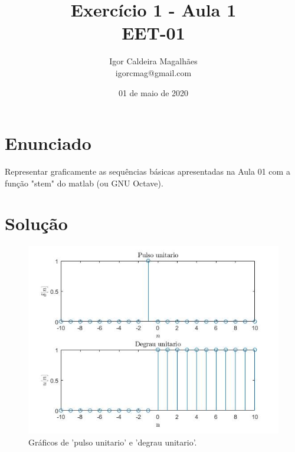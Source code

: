 \documentclass[a4paper, 12pt]{article}
\title{Exercício 1 - Aula 1 \\ EET-01}
\author{
  Igor Caldeira Magalhães\\igorcmag@gmail.com
}
\date{01 de maio de 2020}
\begin{document}
\maketitle
\section{Enunciado}

Representar graficamente as sequências básicas apresentadas na Aula 01 com a função "stem" do matlab (ou GNU Octave).


\section{Solução}



\begin{figure}[H]
	\centering
	\includegraphics[scale=0.7]{img1.jpg} 
	\caption{Gráficos de 'pulso unitario' e 'degrau unitario'.}
	\label{fig:1a}
\end{figure}
\end{document}
